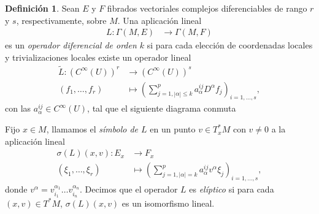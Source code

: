 \documentclass[12pt,a4paper]{article}
\theoremstyle{definition} \newtheorem{defn}[thm]{Definición}
\theoremstyle{definition} \newtheorem{ejemplo}[thm]{Ejemplo}
\theoremstyle{definition} \newtheorem{ejercicio}[thm]{Ejercicio}
\theoremstyle{remark} \newtheorem*{obs}{Observación}
\newcommand{\CC}{\mathbb{C}}
\begin{document}
   \begin{defn}
     Sean $E$ y $F$ fibrados vectoriales complejos diferenciables de rango $r$ y $s$, respectivamente, sobre $M$. Una aplicación lineal
     \begin{align*}
       L :\Gamma(M,E)&\longrightarrow \Gamma(M,F)
       \end{align*}
       es un \emph{operador diferencial de orden $k$} si para cada elección de coordenadas locales y trivializaciones locales existe un operador lineal 
	 \begin{align*}
	 \tilde{L} :(C^\infty(U))^r&\longrightarrow (C^\infty(U))^s\\
	 (f_1,\dots,f_r) &\longmapsto \left(\sum_{j=1, |\alpha|\leq k}^p a^{ij}_\alpha D^\alpha f_j\right)_{i=1,\dots,s},
	   \end{align*}
	   con las $a_{\alpha}^{ij} \in C^\infty(U)$,
	 tal que el siguiente diagrama conmuta
	 \begin{center}
	 \end{center}	
	 Fijo $x\in M$, llamamos el \emph{símbolo de $L$} en un punto $v\in T^*_xM$ con $v\neq0$ a la aplicación lineal
	 \begin{align*}
	   \sigma(L)(x,v) :E_x&\longrightarrow F_x\\ 
	   (\xi_1,\dots,\xi_r) &\longmapsto \left( \sum_{j=1,|\alpha|=k}^p a_{\alpha}^{ij}v^\alpha\xi_j\right)_{i=1,\dots,s},
	   \end{align*}
	   donde $v^\alpha=v_{i_1}^{\alpha_1}\dots v_{i_n}^{\alpha_n}$.
	   Decimos que el operador $L$ es \emph{elíptico} si para cada $(x,v)\in T^*M$, $\sigma(L)(x,v)$ es un isomorfismo lineal. 
   \end{defn}
\end{document}

